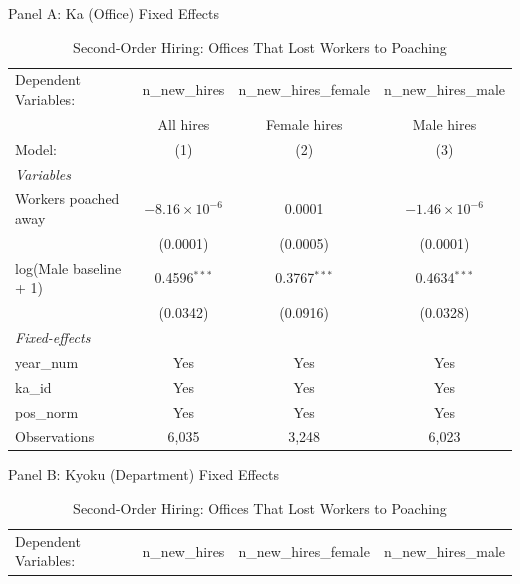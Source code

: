 \begin{table}[htbp]
\centering
\begin{threeparttable}
\caption{Second-Order Hiring: Offices That Lost Workers to Poaching}
\label{tab:donor-hiring}
\small
Panel A: Ka (Office) Fixed Effects\\[1ex]
\begingroup
\centering
\begin{tabular}{lccc}
   \tabularnewline \midrule \midrule
   Dependent Variables:   & n\_new\_hires          & n\_new\_hires\_female    & n\_new\_hires\_male\\     
                          & All hires              & Female hires             & Male hires \\   
   Model:                 & (1)                    & (2)                      & (3)\\  
   \midrule
   \emph{Variables}\\
   Workers poached away   & $-8.16\times 10^{-6}$  & 0.0001                   & $-1.46\times 10^{-6}$\\    
                          & (0.0001)               & (0.0005)                 & (0.0001)\\   
   log(Male baseline + 1) & 0.4596$^{***}$         & 0.3767$^{***}$           & 0.4634$^{***}$\\   
                          & (0.0342)               & (0.0916)                 & (0.0328)\\   
   \midrule
   \emph{Fixed-effects}\\
   year\_num              & Yes                    & Yes                      & Yes\\  
   ka\_id                 & Yes                    & Yes                      & Yes\\  
   pos\_norm              & Yes                    & Yes                      & Yes\\  
   \midrule
   Observations           & 6,035                  & 3,248                    & 6,023\\  
   \midrule \midrule
\end{tabular}
\par\endgroup
\vspace{2ex}
Panel B: Kyoku (Department) Fixed Effects\\[1ex]
\begingroup
\centering
\begin{tabular}{lccc}
   \tabularnewline \midrule \midrule
   Dependent Variables:   & n\_new\_hires          & n\_new\_hires\_female    & n\_new\_hires\_male\\     

\end{tabular}
\end{threeparttable}
\end{table}
